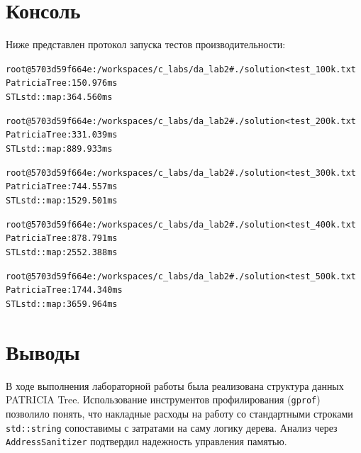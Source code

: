 \documentclass[unicode, 12pt, a4paper,oneside,fleqn]{article}
\begin{document}
\begin{center}
\end{center}

\section{Консоль}
Ниже представлен протокол запуска тестов производительности:
\begin{alltt}
root@5703d59f664e:/workspaces/c_labs/da_lab2# ./solution < test_100k.txt
Patricia Tree: 150.976 ms
STL std::map:  364.560 ms

root@5703d59f664e:/workspaces/c_labs/da_lab2# ./solution < test_200k.txt
Patricia Tree: 331.039 ms
STL std::map:  889.933 ms

root@5703d59f664e:/workspaces/c_labs/da_lab2# ./solution < test_300k.txt
Patricia Tree: 744.557 ms
STL std::map:  1529.501 ms

root@5703d59f664e:/workspaces/c_labs/da_lab2# ./solution < test_400k.txt
Patricia Tree: 878.791 ms
STL std::map:  2552.388 ms

root@5703d59f664e:/workspaces/c_labs/da_lab2# ./solution < test_500k.txt
Patricia Tree: 1744.340 ms
STL std::map:  3659.964 ms
\end{alltt}

\section{Выводы}
В ходе выполнения лабораторной работы была реализована структура данных PATRICIA Tree. Использование инструментов профилирования (\texttt{gprof}) позволило понять, что накладные расходы на работу со стандартными строками \texttt{std::string} сопоставимы с затратами на саму логику дерева. Анализ через \texttt{AddressSanitizer} подтвердил надежность управления памятью.

\pagebreak


\end{document}
